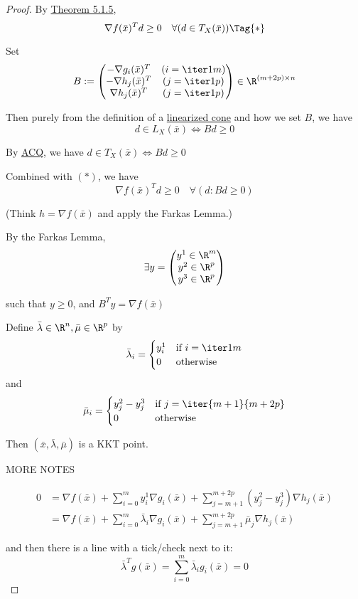 \begin{proof}
  \def\bm{\bar\mu}\def\bl{\bar\lambda}\def\bx{\bar x}
  By \href{c8e5836}{Theorem 5.1.5},
  \begin{equation*}
    \nabla f(\bx)^Td\geq0\quad\forall(d\in T_X(\bx))\Tag{*}
  \end{equation*}

  Set
  $$
    B:=\begin{pmatrix}
      -\nabla g_i(\bx)^T & (i=\iter1m) \\
      -\nabla h_j(\bx)^T & (j=\iter1p) \\
      \nabla h_j(\bx)^T  & (j=\iter1p)
    \end{pmatrix}\in\R^{(m+2p)\times{n}}
  $$

  Then purely from the definition of a \href{ca4f471}{linearized cone} and how we
  set $B$, we have
  $$
    d\in L_X(\bx)\iff Bd\geq0
  $$

  By \href{adc266e}{ACQ}, we have $d\in T_X(\bx)\iff Bd\geq0$

  Combined with $(*)$, we have
  $$
    \nabla f(\bx)^Td\geq0\quad\forall(d:Bd\geq0)
  $$

  (Think $h=\nabla f(\bx)$ and apply the Farkas Lemma.)

  By the Farkas Lemma,
  $$
    \exists y=
    \begin{pmatrix}
      y^1\in\R^m \\y^2\in\R^p\\y^3\in\R^p
    \end{pmatrix}
  $$

  such that $y\geq0$, and $B^Ty=\nabla f(\bx)$

  Define $\bl\in\R^n,\bm\in\R^p$ by
  $$
    \bl_i=\begin{cases}
      y^1_i & \text{if $i=\iter1m$} \\
      0     & \text{otherwise}
    \end{cases}
  $$
  and
  $$
    \bm_i=\begin{cases}
      y^2_j - y^3_j & \text{if $j=\iter{m+1}{m+2p}$} \\
      0             & \text{otherwise}
    \end{cases}
  $$

  Then $(\bx,\bl,\bm)$ is a KKT point.

  MORE NOTES

  \begin{align*}
    0
     & = \nabla f(\bx)
    +\sum_{i=0}^my^1_i\nabla g_i(\bx)
    +\sum_{j=m+1}^{m+2p}(y^2_j-y^3_j)\nabla h_j(\bx) \\
     & = \nabla f(\bx)
    +\sum_{i=0}^m \bl_i\nabla g_i(\bx)
    +\sum_{j=m+1}^{m+2p}\bm_j\nabla h_j(\bx)
  \end{align*}

  and then there is a line with a tick/check next to it:
  $$
    \bl^Tg(\bx)=\sum_{i=0}^m\bl_ig_i(\bx)=0
  $$
\end{proof}

